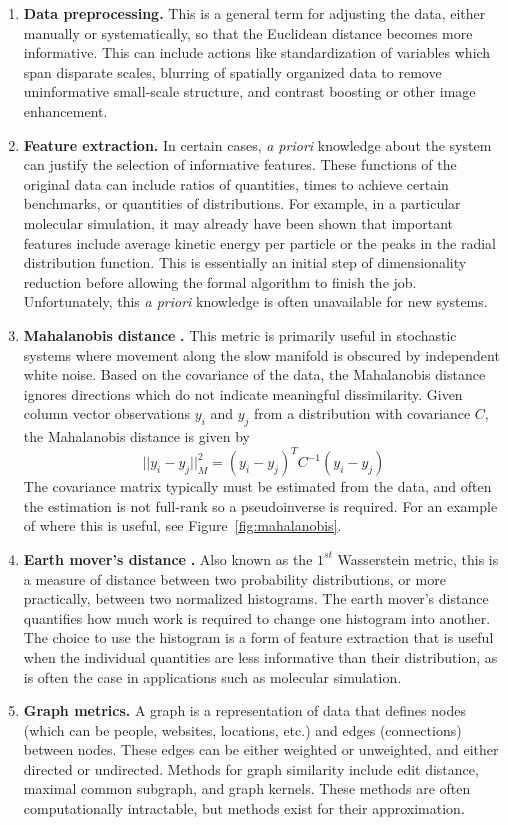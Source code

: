 \documentclass[12pt]{article}
\begin{document}
\begin{enumerate}
\item \textbf{Data preprocessing.}  This is a general term for adjusting the data, either manually or systematically, so that the Euclidean distance becomes more informative. This can include actions like standardization of variables which span disparate scales, blurring of spatially organized data to remove uninformative small-scale structure, and contrast boosting or other image enhancement.
\item \textbf{Feature extraction.} In certain cases, \textit{a priori} knowledge about the system can justify the selection of informative features. These functions of the original data can include ratios of quantities, times to achieve certain benchmarks, or quantities of distributions. For example, in a particular molecular simulation, it may already have been shown that important features include average kinetic energy per particle or the peaks in the radial distribution function. This is essentially an initial step of dimensionality reduction before allowing the formal algorithm to finish the job. Unfortunately, this \textit{a priori} knowledge is often unavailable for new systems.
\item \textbf{Mahalanobis distance }\cite{Dsilva2015, Dsilva, Mahalanobis1936}\textbf{.}  This metric is primarily useful in stochastic systems where movement along the slow manifold is obscured by independent white noise. Based on the covariance of the data, the Mahalanobis distance ignores directions which do not indicate meaningful dissimilarity. Given column vector observations $y_i$ and $y_j$ from a distribution with covariance $C$, the Mahalanobis distance is given by
\[
||y_i-y_j||^2_M = (y_i-y_j)^TC^{-1}(y_i-y_j)
\]
The covariance matrix typically must be estimated from the data, and often the estimation is not full-rank so a pseudoinverse is required. For an example of where this is useful, see Figure~\ref{fig:mahalanobis}.
\item \textbf{Earth mover's distance }\cite{Levina2001}\textbf{.}   Also known as the $1^{st}$ Wasserstein metric, this is a measure of distance between two probability distributions, or more practically, between two normalized histograms. The earth mover's distance quantifies how much work is required to change one histogram into another. The choice to use the histogram is a form of feature extraction that is useful when the individual quantities are less informative than their distribution, as is often the case in applications such as molecular simulation.
\item \textbf{Graph metrics.} A graph is a representation of data that defines nodes (which can be people, websites, locations, etc.) and edges (connections) between nodes. These edges can be either weighted or unweighted, and either directed or undirected. Methods for graph similarity include edit distance, maximal common subgraph, and graph kernels. These methods are often computationally intractable, but methods exist for their approximation.
\end{enumerate}
\end{document}
